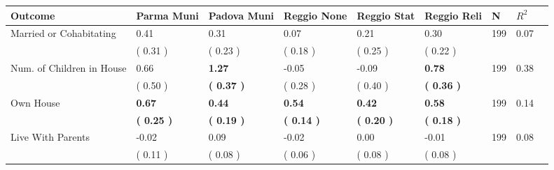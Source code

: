 \begin{tabular}{L{6.2cm} C{1.8cm} C{1.8cm} C{1.8cm} C{1.8cm} C{1.8cm} C{1.8cm} C{0.3cm} C{0.3cm}}
\toprule
 \textbf{Outcome} & \textbf{Parma Muni} & \textbf{Padova Muni} & \textbf{Reggio None} & \textbf{Reggio Stat} & \textbf{Reggio Reli} & \textbf{N} & \textbf{$ R^2$} \\
\midrule
Married or Cohabitating &      0.41 &      0.31 &      0.07 &      0.21 &      0.30  & 199 &       0.07 \\ 
 & (     0.31 ) & (     0.23 ) & (     0.18 ) & (     0.25 ) & (     0.22 )  & \\
Num. of Children in House &      0.66 & \textbf{     1.27} &     -0.05 &     -0.09 & \textbf{     0.78}  & 199 &       0.38 \\ 
 & (     0.50 ) & \textbf{(     0.37 )} & (     0.28 ) & (     0.40 ) & \textbf{(     0.36 )}  & \\
Own House & \textbf{     0.67} & \textbf{     0.44} & \textbf{     0.54} & \textbf{     0.42} & \textbf{     0.58}  & 199 &       0.14 \\ 
 & \textbf{(     0.25 )} & \textbf{(     0.19 )} & \textbf{(     0.14 )} & \textbf{(     0.20 )} & \textbf{(     0.18 )}  & \\
Live With Parents &     -0.02 &      0.09 &     -0.02 &      0.00 &     -0.01  & 199 &       0.08 \\ 
 & (     0.11 ) & (     0.08 ) & (     0.06 ) & (     0.08 ) & (     0.08 )  & \\
\bottomrule
\end{tabular}
